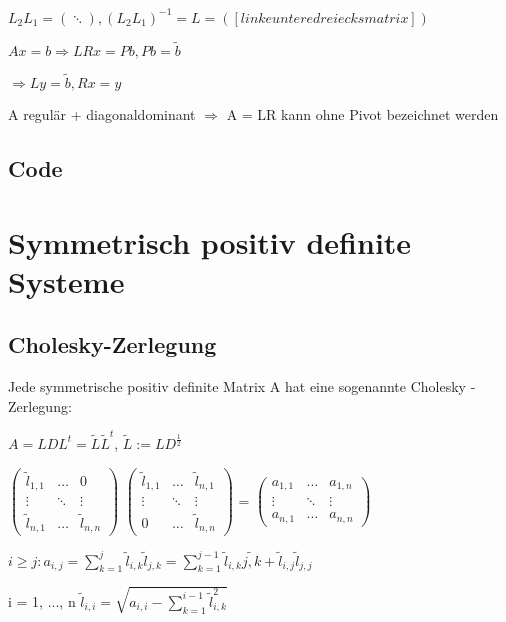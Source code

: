 \documentclass[12pt,a4paper]{article} %
\newcommand*\tab[1][1cm]{\hspace*{#1}}
\begin{document}
	$L_2L_1 = (\ddots), (L_2L_1)^{-1} = L = ([linke untere dreiecks matrix])$
	
	$Ax = b \Rightarrow LRx = Pb, Pb = \tilde{b}$
	
	$\Rightarrow Ly = \tilde{b}, Rx = y$
	
	A regulär + diagonaldominant $\Rightarrow$ A = LR kann ohne Pivot bezeichnet werden
	
	\subsection{Code}
	
	\newpage
	
	\section{Symmetrisch positiv definite Systeme}
	
	\subsection{Cholesky-Zerlegung}
	
	Jede symmetrische positiv definite Matrix A hat eine sogenannte Cholesky - Zerlegung:
	
	$A = LDL^t = \tilde{L}\tilde{L}^t$, $\tilde{L} := LD^{\frac{1}{2}}$
	
	$\begin{pmatrix}
		\tilde{l}_{1,1} & \dots & 0 \\
		\vdots & \ddots & \vdots \\
		\tilde{l}_{n,1} & \dots & \tilde{l}_{n,n}
	\end{pmatrix}$
	$\begin{pmatrix}
		\tilde{l}_{1,1} & \dots & \tilde{l}_{n,1} \\
		\vdots & \ddots & \vdots \\
		0 & \dots & \tilde{l}_{n,n}
	\end{pmatrix}$
	=
	$\begin{pmatrix}
		a_{1,1} & \dots & a_{1, n} \\
		\vdots & \ddots & \vdots \\
		a_{n, 1} & \dots & a_{n, n}
	\end{pmatrix}$
	
	$i \ge j: a_{i, j} = \sum\limits_{k = 1}^j\tilde{l}_{i, k}\tilde{l}_{j, k} = \sum\limits_{k = 1}^{j - 1}\tilde{l}_{i, k}\tilde{j, k} + \tilde{l}_{i, j}\tilde{l}_{j, j}$
	
	i = 1, ..., n \tab $\tilde{l}_{i, i} = \sqrt{a_{i, i} - \sum\limits_{k = 1}^{i - 1}\tilde{l}_{i, k}^2}$
	
\end{document}
